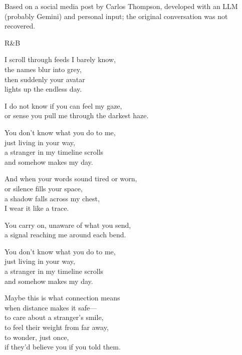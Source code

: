 

\begin{notes}
Based on a social media post by Carlos Thompson, developed with an LLM (probably Gemini) and personal input; the original conversation was not recovered.
\end{notes}
\begin{style}
R\&B
\end{style}
\begin{lyrics}


I scroll through feeds I barely know,\\
the names blur into grey,\\
then suddenly your avatar\\
lights up the endless day.

I do not know if you can feel my gaze,\\
or sense you pull me through the darkest haze.

You don't know what you do to me,\\
just living in your way,\\
a stranger in my timeline scrolls\\
and somehow makes my day.

And when your words sound tired or worn,\\
or silence fills your space,\\
a shadow falls across my chest,\\
I wear it like a trace.

You carry on, unaware of what you send,\\
a signal reaching me around each bend.

You don't know what you do to me,\\
just living in your way,\\
a stranger in my timeline scrolls\\
and somehow makes my day.


Maybe this is what connection means\\
when distance makes it safe—\\
to care about a stranger's smile,\\
to feel their weight from far away,\\
to wonder, just once,\\
if they'd believe you if you told them.


\end{lyrics}
